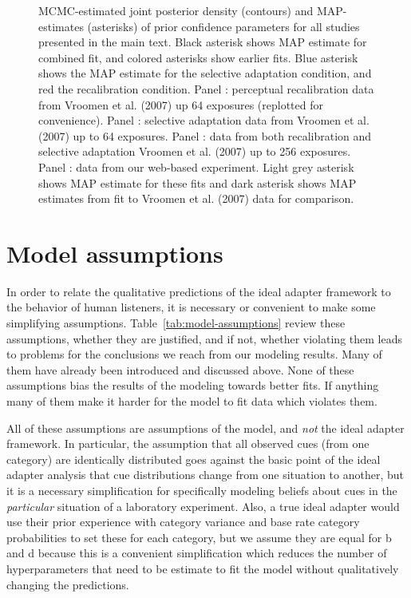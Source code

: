\begin{figure}
{    \label{fig:conf-mturk}
  }
  \caption{MCMC-estimated joint posterior density (contours) and MAP-estimates (asterisks) of prior confidence parameters for all studies presented in the main text. Black asterisk shows MAP estimate for combined fit, and colored asterisks show earlier fits. Blue asterisk shows the MAP estimate for the selective adaptation condition, and red the recalibration condition. Panel : perceptual recalibration data from Vroomen et al. (2007) up 64 exposures (replotted for convenience). Panel : selective adaptation data from Vroomen et al. (2007) up to 64 exposures. Panel : data from both recalibration and selective adaptation Vroomen et al. (2007) up to 256 exposures. Panel : data from our web-based experiment. Light grey asterisk shows MAP estimate for these fits and dark asterisk shows MAP estimates from fit to Vroomen et al. (2007) data for comparison.}
  \label{fig:confidence-hyperparam-posteriors}
\end{figure}


\section{Model assumptions}
\label{sec:model-assumptions}

In order to relate the qualitative predictions of the ideal adapter framework to the behavior of human listeners, it is necessary or convenient to make some simplifying assumptions.  Table~\ref{tab:model-assumptions} review these assumptions, whether they are justified, and if not, whether violating them leads to problems for the conclusions we reach from our modeling results. Many of them have already been introduced and discussed above.  None of these assumptions bias the results of the modeling towards better fits.  If anything many of them make it harder for the model to fit data which violates them.

All of these assumptions are assumptions of the model, and \emph{not} the ideal adapter framework.  In particular, the assumption that all observed cues (from one category) are identically distributed goes against the basic point of the ideal adapter analysis that cue distributions change from one situation to another, but it is a necessary simplification for specifically modeling beliefs about cues in the \emph{particular} situation of a laboratory experiment.  Also, a true ideal adapter would use their prior experience with category variance and base rate category probabilities to set these for each category, but we assume they are equal for \ph b and \ph d because this is a convenient simplification which reduces the number of hyperparameters that need to be estimate to fit the model without qualitatively changing the predictions.

